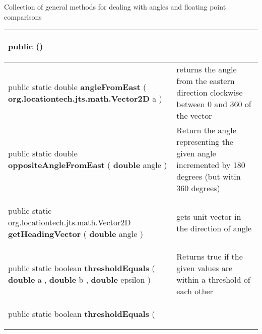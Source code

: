  {\scriptsize Collection of general methods for dealing with angles and floating point comparisons
 
\vspace*{-5pt} 
\begin{tabularx}{\linewidth}{m{}|m{}}
\label{tab:MathUtilities}
\begin{raggedleft}public  \textbf{\hyperref[tab:MathUtilities]{\color{blue}{MathUtilities}}}()
\end{raggedleft} &
 \\ \hline 
\begin{raggedleft}public static double \textbf{angleFromEast }(\hspace*{ 5pt} \textbf{org.locationtech.jts.math.Vector2D} a  )
\end{raggedleft} &
 returns the angle from the eastern direction clockwise between 0 and 360 of the vector\\ \hline 
\begin{raggedleft}public static double \textbf{oppositeAngleFromEast }(\hspace*{ 5pt} \textbf{double} angle  )
\end{raggedleft} &
 Return the angle representing the given angle incremented by 180 degrees (but witin 360 degrees)\\ \hline 
\begin{raggedleft}public static org.locationtech.jts.math.Vector2D \textbf{getHeadingVector }(\hspace*{ 5pt} \textbf{double} angle  )
\end{raggedleft} &
 gets unit vector in the direction of angle\\ \hline 
\begin{raggedleft}public static boolean \textbf{thresholdEquals }(\newline \hfill 
\hspace*{ 5pt} \textbf{double} a , \newline
 \hspace*{ 5pt} \textbf{double} b , \newline
 \hspace*{ 5pt} \textbf{double} epsilon  )
\end{raggedleft} &
 Returns true if the given values are within a threshold of each other\\ \hline 
\begin{raggedleft}public static boolean \textbf{thresholdEquals }(\newline \hfill 

\end{raggedleft}
\end{tabularx}}
